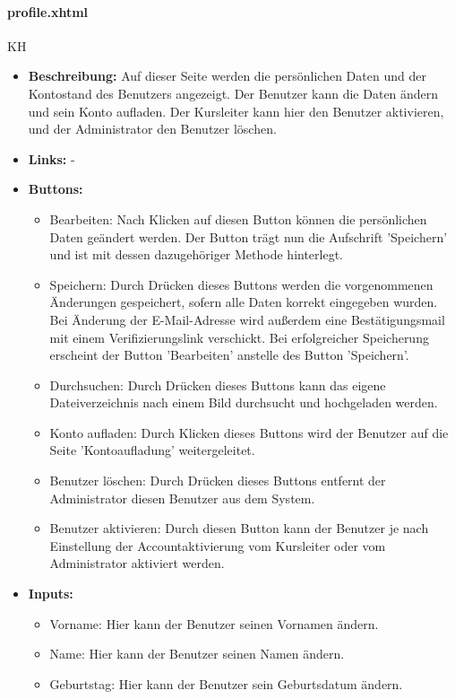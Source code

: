 				\paragraph{profile.xhtml}
					KH\\
					\begin{itemize}
						\item \textbf{Beschreibung:} Auf dieser Seite werden die persönlichen Daten und der Kontostand des Benutzers angezeigt. Der Benutzer kann die Daten ändern und sein Konto aufladen. Der Kursleiter kann hier den Benutzer aktivieren, und der Administrator den Benutzer löschen.
						\item \textbf{Links:} -
						\item \textbf{Buttons:}
							\begin{itemize}
								\item Bearbeiten: Nach Klicken auf diesen Button können die persönlichen Daten geändert werden. Der Button trägt nun die Aufschrift 'Speichern' und ist mit dessen dazugehöriger Methode hinterlegt.
								\item Speichern: Durch Drücken dieses Buttons werden die vorgenommenen Änderungen gespeichert, sofern alle Daten korrekt eingegeben wurden. Bei Änderung der E-Mail-Adresse wird außerdem eine Bestätigungsmail mit einem Verifizierungslink verschickt. Bei erfolgreicher Speicherung erscheint der Button 'Bearbeiten' anstelle des Button 'Speichern'.
								\item Durchsuchen: Durch Drücken dieses Buttons kann das eigene Dateiverzeichnis nach einem Bild durchsucht und hochgeladen werden.
								\item Konto aufladen: Durch Klicken dieses Buttons wird der Benutzer auf die Seite 'Kontoaufladung' weitergeleitet.
								\item Benutzer löschen: Durch Drücken dieses Buttons entfernt der Administrator diesen Benutzer aus dem System.
								\item Benutzer aktivieren: Durch diesen Button kann der Benutzer je nach Einstellung der Accountaktivierung vom Kursleiter oder vom Administrator aktiviert werden.
							\end{itemize}
						\item \textbf{Inputs:}
							\begin{itemize}
								\item Vorname: Hier kann der Benutzer seinen Vornamen ändern.
								\item Name: Hier kann der Benutzer seinen Namen ändern.
								\item Geburtstag: Hier kann der Benutzer sein Geburtsdatum ändern.

\end{itemize}
\end{itemize}
